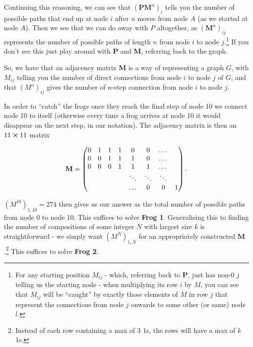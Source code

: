 \documentclass[hidelinks]{article}
\begin{document}
Continuing this reasoning, we can see that $(\textbf{PM}^n)_i$ tells you the number of possible paths that end up at node $i$ after $n$ moves from node $A$ (as we started at node $A$).  Then we see that we can do away with $P$ altogether, as $(\textbf{M}^n)_{ij}$ represents the number of possible paths of length $n$ from node $i$ to node $j$.\footnote{For any starting position $M_{ij}$ - which, referring back to \textbf{P}, just has non-0 $j$ telling us the starting node - when multiplying its row $i$ by $M$, you can see that $M_{ij}$ will be ``caught''  by exactly those elements of $M$ in row $j$ that represent the connections from node $j$ onwards to some other (or same) node $l$.}  If you don't see this just play around with $\textbf{P}$ and $\textbf{M}$, referring back to the graph.

So, we have that an adjacency matrix \textbf{M} is a way of representing a graph $G$, with $M_{ij}$ telling you the number of direct connections from node $i$ to node $j$ of $G$, and that $(M^n)_{ij}$ gives the number of $n$-step connection from node $i$ to node $j$.  

In order to ``catch'' the frogs once they reach the final step of node 10 we connect node 10 to itself (otherwise every time a frog arrives at node 10 it would disappear on the next step, in our notation).  The adjacency matrix is then an $11\cross11$ matrix 


\begin{equation}
\text{\textbf{M}} = 
\begin{pmatrix}
0 & 1 & 1 & 1 & 0 & 0 & \dots &\\
0 & 0 & 1 & 1 & 1 & 0 & \dots &\\
0 & 0 & 0 & 1 & 1 & 1 & \dots &\\
&  &  &  & \ddots & \ddots & \ddots & \\
&   &   &   & \dots  & 0  & 0  &  1
\end{pmatrix}.
\end{equation}

$(M^{10})_{1,10}=274$ then gives us our answer as the total number of possible paths from node 0 to node 10. This suffices to solve \textbf{Frog 1}. Generalising this to finding the number of compositions of some integer $N$ with largest size $k$ is straightforward - we simply want $(M^N)_{1,N}$ for an appropriately constructed $\textbf{M}$.\footnote{Instead of each row containing a max of 3 $1$s, the rows will have a max of $k$ 1s.} This suffices to solve \textbf{Frog 2}.
\end{document}

